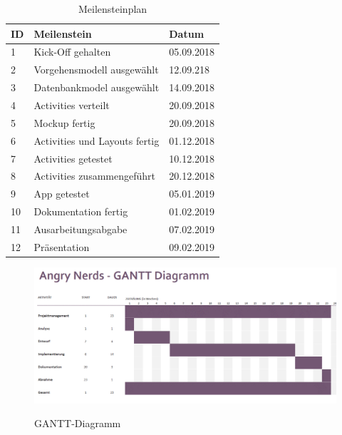 \begin{table}[H]
\caption{Meilensteinplan} %
\begin{tabular}{|p{2cm}|p{9cm}|p{3cm}|}
\hline
{\textbf{ID}} & {\textbf{Meilenstein}} & {\textbf{Datum}} \\ \hline
1 & Kick-Off gehalten & 05.09.2018 \\ \hline
2 & Vorgehensmodell ausgewählt & 12.09.218 \\ \hline
3 & Datenbankmodel ausgewählt & 14.09.2018 \\ \hline 
4 & Activities verteilt & 20.09.2018 \\ \hline
5 & Mockup fertig & 20.09.2018 \\ \hline
6 & Activities und Layouts fertig & 01.12.2018 \\ \hline
7 & Activities getestet & 10.12.2018 \\ \hline
8 & Activities zusammengeführt & 20.12.2018 \\ \hline
9 & App getestet & 05.01.2019 \\ \hline
10 & Dokumentation fertig & 01.02.2019 \\ \hline
11 & Ausarbeitungsabgabe & 07.02.2019 \\ \hline
12  & Präsentation & 09.02.2019\\ \hline
\end{tabular}
\end{table}

\begin{figure}[H]
\centering
\begin{minipage}[t]{1\textwidth} %
\caption{GANTT-Diagramm} %
\includegraphics[width=1\textwidth]{img/GANTT}\\ %
\end{minipage}
\end{figure}

